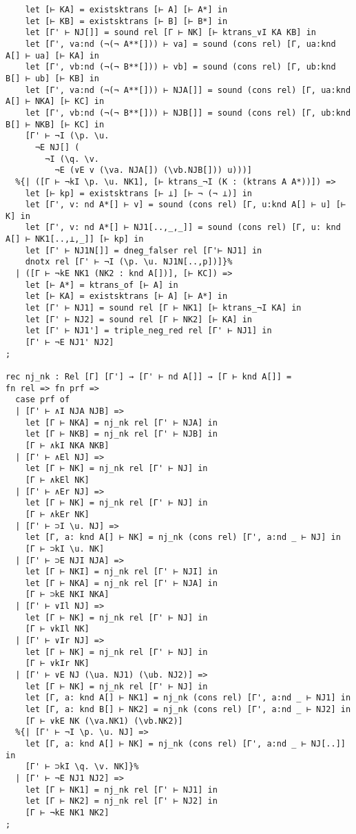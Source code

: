 \documentclass{article}
\begin{document}
\begin{lstlisting}
    let [⊢ KA] = existsktrans [⊢ A] [⊢ A*] in
    let [⊢ KB] = existsktrans [⊢ B] [⊢ B*] in
    let [Γ' ⊢ NJ[]] = sound rel [Γ ⊢ NK] [⊢ ktrans_∨I KA KB] in
    let [Γ', va:nd (¬(¬ A**[])) ⊢ va] = sound (cons rel) [Γ, ua:knd A[] ⊢ ua] [⊢ KA] in
    let [Γ', vb:nd (¬(¬ B**[])) ⊢ vb] = sound (cons rel) [Γ, ub:knd B[] ⊢ ub] [⊢ KB] in
    let [Γ', va:nd (¬(¬ A**[])) ⊢ NJA[]] = sound (cons rel) [Γ, ua:knd A[] ⊢ NKA] [⊢ KC] in
    let [Γ', vb:nd (¬(¬ B**[])) ⊢ NJB[]] = sound (cons rel) [Γ, ub:knd B[] ⊢ NKB] [⊢ KC] in
    [Γ' ⊢ ¬I (\p. \u.
      ¬E NJ[] (
        ¬I (\q. \v.
          ¬E (∨E v (\va. NJA[]) (\vb.NJB[])) u)))]
  %{| ([Γ ⊢ ¬kI \p. \u. NK1], [⊢ ktrans_¬I (K : (ktrans A A*))]) =>
    let [⊢ kp] = existsktrans [⊢ ⊥] [⊢ ¬ (¬ ⊥)] in
    let [Γ', v: nd A*[] ⊢ v] = sound (cons rel) [Γ, u:knd A[] ⊢ u] [⊢ K] in
    let [Γ', v: nd A*[] ⊢ NJ1[..,_,_]] = sound (cons rel) [Γ, u: knd A[] ⊢ NK1[..,⊥,_]] [⊢ kp] in
    let [Γ' ⊢ NJ1N[]] = dneg_falser rel [Γ'⊢ NJ1] in
    dnotx rel [Γ' ⊢ ¬I (\p. \u. NJ1N[..,p])]}%
  | ([Γ ⊢ ¬kE NK1 (NK2 : knd A[])], [⊢ KC]) =>
    let [⊢ A*] = ktrans_of [⊢ A] in
    let [⊢ KA] = existsktrans [⊢ A] [⊢ A*] in
    let [Γ' ⊢ NJ1] = sound rel [Γ ⊢ NK1] [⊢ ktrans_¬I KA] in
    let [Γ' ⊢ NJ2] = sound rel [Γ ⊢ NK2] [⊢ KA] in
    let [Γ' ⊢ NJ1'] = triple_neg_red rel [Γ' ⊢ NJ1] in
    [Γ' ⊢ ¬E NJ1' NJ2]
;

rec nj_nk : Rel [Γ] [Γ'] → [Γ' ⊢ nd A[]] → [Γ ⊢ knd A[]] = 
fn rel => fn prf =>
  case prf of
  | [Γ' ⊢ ∧I NJA NJB] =>
    let [Γ ⊢ NKA] = nj_nk rel [Γ' ⊢ NJA] in
    let [Γ ⊢ NKB] = nj_nk rel [Γ' ⊢ NJB] in
    [Γ ⊢ ∧kI NKA NKB]
  | [Γ' ⊢ ∧El NJ] =>
    let [Γ ⊢ NK] = nj_nk rel [Γ' ⊢ NJ] in
    [Γ ⊢ ∧kEl NK]
  | [Γ' ⊢ ∧Er NJ] =>
    let [Γ ⊢ NK] = nj_nk rel [Γ' ⊢ NJ] in
    [Γ ⊢ ∧kEr NK]
  | [Γ' ⊢ ⊃I \u. NJ] =>
    let [Γ, a: knd A[] ⊢ NK] = nj_nk (cons rel) [Γ', a:nd _ ⊢ NJ] in
    [Γ ⊢ ⊃kI \u. NK]
  | [Γ' ⊢ ⊃E NJI NJA] =>
    let [Γ ⊢ NKI] = nj_nk rel [Γ' ⊢ NJI] in
    let [Γ ⊢ NKA] = nj_nk rel [Γ' ⊢ NJA] in
    [Γ ⊢ ⊃kE NKI NKA]
  | [Γ' ⊢ ∨Il NJ] =>
    let [Γ ⊢ NK] = nj_nk rel [Γ' ⊢ NJ] in
    [Γ ⊢ ∨kIl NK]
  | [Γ' ⊢ ∨Ir NJ] =>
    let [Γ ⊢ NK] = nj_nk rel [Γ' ⊢ NJ] in
    [Γ ⊢ ∨kIr NK]
  | [Γ' ⊢ ∨E NJ (\ua. NJ1) (\ub. NJ2)] =>
    let [Γ ⊢ NK] = nj_nk rel [Γ' ⊢ NJ] in
    let [Γ, a: knd A[] ⊢ NK1] = nj_nk (cons rel) [Γ', a:nd _ ⊢ NJ1] in
    let [Γ, a: knd B[] ⊢ NK2] = nj_nk (cons rel) [Γ', a:nd _ ⊢ NJ2] in
    [Γ ⊢ ∨kE NK (\va.NK1) (\vb.NK2)]
  %{| [Γ' ⊢ ¬I \p. \u. NJ] =>
    let [Γ, a: knd A[] ⊢ NK] = nj_nk (cons rel) [Γ', a:nd _ ⊢ NJ[..]] in
    [Γ' ⊢ ⊃kI \q. \v. NK]}%
  | [Γ' ⊢ ¬E NJ1 NJ2] =>
    let [Γ ⊢ NK1] = nj_nk rel [Γ' ⊢ NJ1] in
    let [Γ ⊢ NK2] = nj_nk rel [Γ' ⊢ NJ2] in
    [Γ ⊢ ¬kE NK1 NK2]
;


\end{lstlisting}
\end{document}
